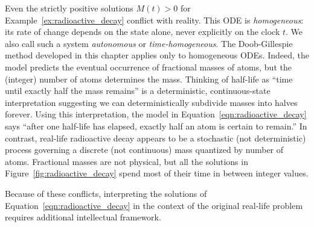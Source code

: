 Even the strictly positive solutions $M(t) > 0$  for Example~\ref{ex:radioactive_decay} conflict with reality.
This ODE is \textit{homogeneous}: its rate of change depends on the state alone, never explicitly on the clock $t$. We also call such a system \textit{autonomous} or \textit{time-homogeneous}. The Doob-Gillespie method developed in this chapter applies only to homogeneous ODEs.
Indeed, the model predicts the eventual occurrence of fractional masses of atoms, but the (integer) number of atoms determines the mass.
Thinking of half-life as ``time until exactly half the mass remains'' is a deterministic, continuous-state interpretation suggesting we can deterministically subdivide masses into halves forever.
Using this interpretation, the model in Equation~\ref{eqn:radioactive_decay} says ``after one half-life has elapsed, exactly half an atom is certain to remain.''
In contrast, real-life radioactive decay appears to be a stochastic (not deterministic) process governing a discrete (not continuous) mass quantized by number of atoms.
Fractional masses are not physical, but all the solutions in Figure~\ref{fig:radioactive_decay} spend most of their time in between integer values.

Because of these conflicts, interpreting the solutions of Equation~\ref{eqn:radioactive_decay} in the context of the original real-life problem requires additional intellectual framework.

